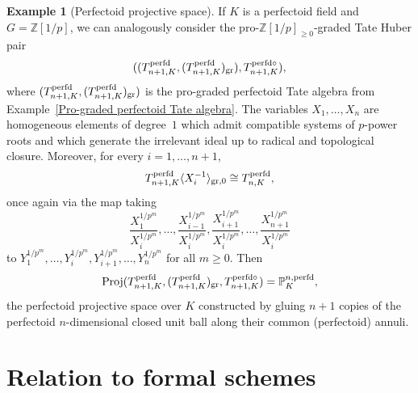 \documentclass[12pt,twoside,a4paper]{article}
\theoremstyle{definition}
\newtheorem{example}[thm]{Example}
\theoremstyle{remark}
\newcommand\gr{{\rm gr}}
\newcommand\perfd{{\rm perfd}}
\newcommand\Proj{{\rm Proj}}
\begin{document}
\begin{example}[Perfectoid projective space]If $K$ is a perfectoid field and $G=\mathbb{Z}[1/p]$, we can analogously consider the pro-$\mathbb{Z}[1/p]_{\geq0}$-graded Tate Huber pair \begin{equation*}((T_{n+1, K}^{\perfd}, (T_{n+1, K}^{\perfd})_{\gr}), T_{n+1, K}^{\perfd\circ}),\end{equation*}where $(T_{n+1, K}^{\perfd}, (T_{n+1, K}^{\perfd})_{\gr})$ is the pro-graded perfectoid Tate algebra from Example~\ref{Pro-graded perfectoid Tate algebra}. The variables $X_1,\dots, X_n$ are homogeneous elements of degree~$1$ which admit compatible systems of $p$-power roots and which generate the irrelevant ideal up to radical and topological closure. Moreover, for every $i=1,\dots, n+1$,\begin{equation*}T_{n+1, K}^{\perfd}\langle X_{i}^{-1}\rangle_{\gr, 0}\cong T_{n, K}^{\perfd},\end{equation*}once again via the map taking \begin{equation*}\frac{X_{1}^{1/p^{m}}}{X_{i}^{1/p^{m}}},\dots, \frac{X_{i-1}^{1/p^{m}}}{X_{i}^{1/p^{m}}}, \frac{X_{i+1}^{1/p^{m}}}{X_{i}^{1/p^{m}}},\dots, \frac{X_{n+1}^{1/p^{m}}}{X_{i}^{1/p^{m}}}\end{equation*}to $Y_{1}^{1/p^{m}},\dots, Y_{i}^{1/p^{m}}, Y_{i+1}^{1/p^{m}},\dots, Y_{n}^{1/p^{m}}$ for all $m\geq0$. Then \begin{equation*}\Proj(T_{n+1, K}^{\perfd}, (T_{n+1, K}^{\perfd})_{\gr}, T_{n+1, K}^{\perfd\circ})=\mathbb{P}_{K}^{n,\perfd},\end{equation*}the perfectoid projective space over $K$ constructed by gluing $n+1$ copies of the perfectoid $n$-dimensional closed unit ball along their common (perfectoid) annuli.\end{example}

\section{Relation to formal schemes}\label{sec:formal}
\end{document}
